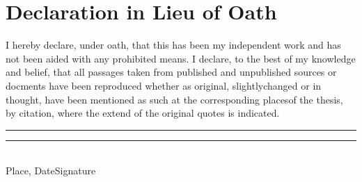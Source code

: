 \section*{\centering Declaration in Lieu of Oath}
\glqq I hereby declare, under oath, that this \MakeLowercase{\thesis} has been my independent work and has not been aided with any prohibited means. I declare, to the best of my knowledge and belief, that all passages taken from published and unpublished sources or docments have been reproduced whether as original, slightlychanged or in thought, have been mentioned as such at the corresponding placesof the thesis, by citation, where the extend of the original quotes is indicated.\grqq\\[5\baselineskip]
\rule{5cm}{0.2pt}\hfill\rule{5cm}{0.2pt}\\
\phantom{Date }Place, Date\hfill Signature\hspace{15mm}

\newpage
